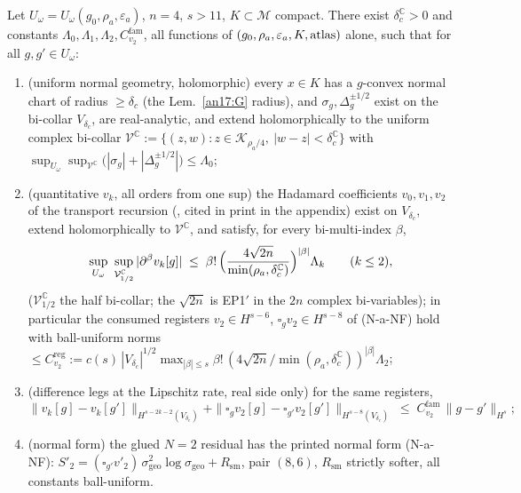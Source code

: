 \begin{proposition}
\label{pac:prop-A}
Let $U_\omega=U_\omega(g_0,\rho_a,\varepsilon_a)$, $n=4$, $s>11$,
$K\subset\mathcal M$ compact. There exist $\delta_c^{\mathbb C}>0$ and
constants $\Lambda_0,\Lambda_1,\Lambda_2,
C^{\mathrm{fam}}_{v_2}$, all functions of
$(g_0,\rho_a,\varepsilon_a,K,\textup{atlas})$ alone, such that for all
$g,g'\in U_\omega$:
\begin{enumerate}[label=\textup{(A\arabic*)},leftmargin=*,nosep]
\item (uniform normal geometry, holomorphic) every $x\in K$ has a
  $g$-convex normal chart of radius $\ge\delta_c$ (the Lem.~\ref{an17:G} radius),
  and $\sigma_g,\Delta^{\pm1/2}_g$ exist on the bi-collar
  $V_{\delta_c}$, are real-analytic, and extend holomorphically to the
  uniform complex bi-collar
  $\mathcal V^{\mathbb C}:=\{(z,w):z\in\mathcal K_{\rho_a/4},\
  |w-z|<\delta_c^{\mathbb C}\}$ with
  $\sup_{U_\omega}\sup_{\mathcal V^{\mathbb C}}
  \bigl(|\sigma_g|+|\Delta^{\pm1/2}_g|\bigr)\le\Lambda_0$;
\item (quantitative $v_k$, all orders from one sup) the Hadamard
  coefficients $v_0,v_1,v_2$ of the transport recursion
  (\cite[Thm.~2.1]{Moretti2003}, cited in print in the appendix) exist on $V_{\delta_c}$, extend holomorphically to
  $\mathcal V^{\mathbb C}$, and satisfy, for every bi-multi-index
  $\beta$,
  \[
    \sup_{U_\omega}\ \sup_{\mathcal V^{\mathbb C}_{1/2}}
    |\partial^\beta v_k[g]|\;\le\;
    \beta!\,\Bigl(\frac{4\sqrt{2n}}{\min(\rho_a,\delta_c^{\mathbb C})}
    \Bigr)^{|\beta|}\Lambda_k
    \qquad(k\le2),
  \]
  ($\mathcal V^{\mathbb C}_{1/2}$ the half bi-collar; the $\sqrt{2n}$
  is EP1$'$ in the $2n$ complex bi-variables); in particular the
  consumed registers $v_2\in H^{s-6}$, $\square_gv_2\in H^{s-8}$ of
  (N-a-NF) hold with ball-uniform norms
  $\le C^{\mathrm{reg}}_{v_2}:=c(s)\,|V_{\delta_c}|^{1/2}
  \max_{|\beta|\le s}\beta!\,(4\sqrt{2n}/\min(\rho_a,
  \delta_c^{\mathbb C}))^{|\beta|}\Lambda_2$;
\item (difference legs at the Lipschitz rate, real side only) for the
  same registers,
  \[
    \|v_k[g]-v_k[g']\|_{H^{s-2k-2}(V_{\delta_c})}
    +\|\square_gv_2[g]-\square_{g'}v_2[g']\|_{H^{s-8}(V_{\delta_c})}
    \;\le\;C^{\mathrm{fam}}_{v_2}\,\|g-g'\|_{H^s};
  \]
\item (normal form) the glued $N{=}2$ residual has the printed normal
  form (N-a-NF):
  $S'_2=(\square_{g'}v'_2)\,\sigma_{\mathrm{geo}}^2
  \log\sigma_{\mathrm{geo}}+R_{\mathrm{sm}}$, pair $(8,6)$,
  $R_{\mathrm{sm}}$ strictly softer, all constants ball-uniform.
\end{enumerate}
\end{proposition}
